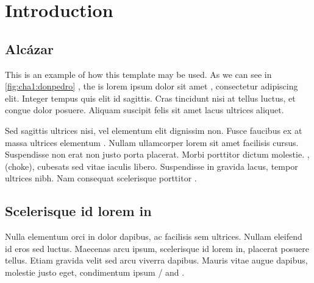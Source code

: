 % 
% 
% 



\clearpage
\cleardoublepage

\chapter{Introduction}

\section{Alcázar}

This is an example of how this template may be used. As we can see in \autoref{fig:cha1:donpedro} \cite{cubesat-impact-astronomy, lora-phy-understanding}, the  is lorem ipsum dolor sit amet  \cite{nasa-soa2023-avionics, book-product-devel, maral-satcoms, solder-defects}, consectetur adipiscing elit. Integer tempus quis elit id sagittis. Cras tincidunt nisi at tellus luctus, et congue dolor posuere. Aliquam suscipit felis sit amet lacus ultrices aliquet. 

Sed sagittis ultrices nisi, vel elementum elit dignissim non. Fusce faucibus ex at massa ultrices elementum \cite{cubesat-impact-astronomy}. Nullam ullamcorper lorem sit amet facilisis cursus. Suspendisse non erat non justo porta placerat. Morbi porttitor dictum molestie. , (\glsdesc{choke}), \glspl{cubesat} sed vitae iaculis libero. Suspendisse in gravida lacus, tempor ultrices nibh. Nam consequat scelerisque porttitor \cite{solder-defects}.


\section{Scelerisque id lorem in}


Nulla elementum orci in dolor dapibus, ac facilisis sem ultrices. Nullam eleifend id eros sed luctus. Maecenas arcu ipsum, scelerisque id lorem in, placerat posuere tellus. Etiam gravida velit sed arcu viverra dapibus. Mauris vitae augue dapibus, molestie justo eget, condimentum ipsum / and  \cite{grounding-schemes-sats}. 

